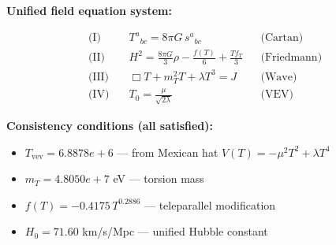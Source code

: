 
\textbf{Unified field equation system:}

\begin{align}
  \text{(I)} \quad & T^a{}_{bc} = 8\pi G \, s^a{}_{bc} && \text{(Cartan)} \\
  \text{(II)} \quad & H^2 = \frac{8\pi G}{3}\rho - \frac{f(T)}{6} + \frac{Tf_T}{3} && \text{(Friedmann)} \\
  \text{(III)} \quad & \Box T + m_T^2 T + \lambda T^3 = J && \text{(Wave)} \\
  \text{(IV)} \quad & T_0 = \frac{\mu}{\sqrt{2\lambda}} && \text{(VEV)}
\end{align}

\textbf{Consistency conditions (all satisfied):}
\begin{itemize}
  \item $T_{\text{vev}} = 6.8878e+6$ — from Mexican hat $V(T) = -\mu^2 T^2 + \lambda T^4$
  \item $m_T = 4.8050e+7$ eV — torsion mass
  \item $f(T) = -0.4175 \, T^{0.2886}$ — teleparallel modification
  \item $H_0 = 71.60$ km/s/Mpc — unified Hubble constant
\end{itemize}